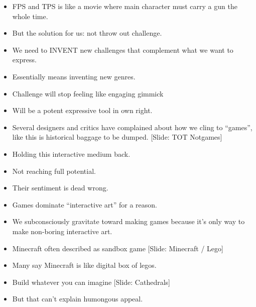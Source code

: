 \documentclass[12pt]{article}
\begin{document}
{\begin{itemize}
\item FPS and TPS is like a movie where main character must carry a gun the whole time.

\item But the solution for us:  not throw out challenge.

\item We need to INVENT new challenges that complement what we want to express.

\item Essentially means inventing new genres.

\item Challenge will stop feeling like engaging gimmick

\item Will be a potent expressive tool in own right.
\end{itemize}



\begin{itemize}

\item Several designers and critics have complained about how we cling to ``games'', like this is historical baggage to be dumped.  [Slide:  TOT Notgames]

\item Holding this interactive medium back.

\item Not reaching full potential.

\item Their sentiment is dead wrong.

\item Games dominate ``interactive art'' for a reason.

\item We subconsciously gravitate toward making games because it's only way to make non-boring interactive art.




\item Minecraft often described as sandbox game [Slide:  Minecraft / Lego]

\item Many say Minecraft is like digital box of legos.



\item Build whatever you can imagine [Slide:  Cathedrals]


\item But that can't explain humongous appeal.


\end{itemize}}
\end{document}
